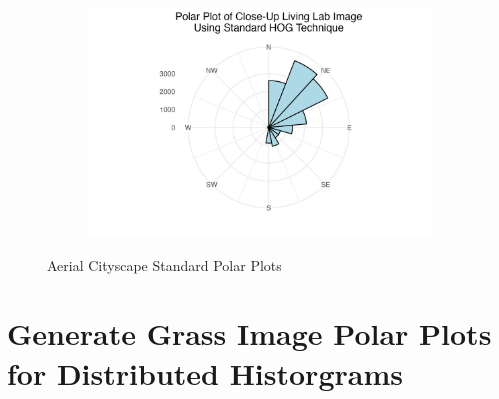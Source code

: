 \documentclass[
  letterpaper,
  DIV=11,
  numbers=noendperiod]{scrreprt}
\begin{document}
\begin{figure}
\begin{minipage}{0.33\linewidth}
\begin{figure}[H]
{}


\end{figure}%

\end{minipage}%
%
\begin{minipage}{0.33\linewidth}

\begin{figure}[H]

{\centering \includegraphics{images/plots/grass/close_up_living_lab_standard_polar_plot.jpg}

}


\end{figure}%

\end{minipage}%

\caption{\label{fig-grass-standard-polar}Aerial Cityscape Standard Polar
Plots}

\end{figure}%

\section{Generate Grass Image Polar Plots for Distributed
Historgrams}\label{generate-grass-image-polar-plots-for-distributed-historgrams}
\end{document}
